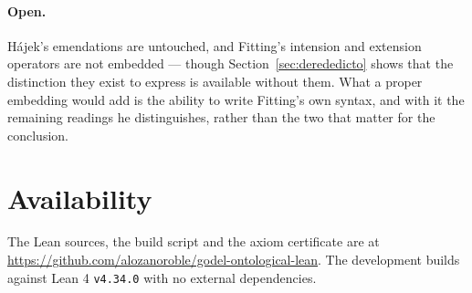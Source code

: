 \documentclass[11pt]{article}
\theoremstyle{plain}
\theoremstyle{definition}
\begin{document}
\paragraph{Open.}
H\'ajek's emendations are untouched, and Fitting's intension and extension
operators are not embedded --- though Section~\ref{sec:derededicto} shows that
the distinction they exist to express is available without them. What a proper
embedding would add is the ability to write Fitting's own syntax, and with it
the remaining readings he distinguishes, rather than the two that matter for
the conclusion.

\section*{Availability}

The Lean sources, the build script and the axiom certificate are at
\url{https://github.com/alozanoroble/godel-ontological-lean}. The development
builds against Lean 4 \texttt{v4.34.0} with no external dependencies.
\end{document}
